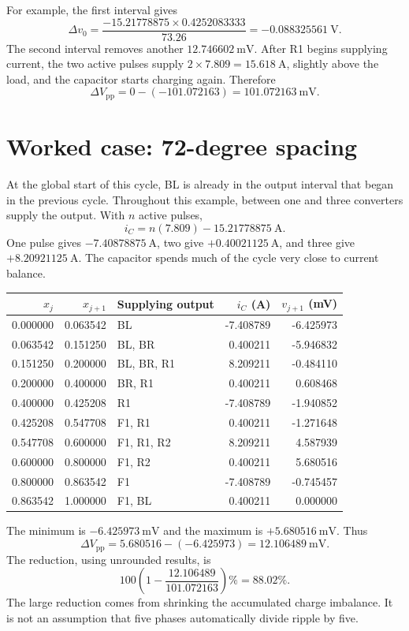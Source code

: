 \documentclass[11pt,a4paper]{article}
\begin{document}
For example, the first interval gives
\[
 \Delta v_0=\frac{-15.21778875\times0.4252083333}{73.26}
           =-0.088325561\ \mathrm{V}.
\]
The second interval removes another $12.746602\ \mathrm{mV}$. After R1 begins
supplying current, the two active pulses supply $2\times7.809=15.618\ \mathrm{A}$,
slightly above the load, and the capacitor starts charging again. Therefore
\[
 \Delta V_{\mathrm{pp}}=0-(-101.072163)=101.072163\ \mathrm{mV}.
\]

\section{Worked case: 72-degree spacing}

At the global start of this cycle, BL is already in the output interval that
began in the previous cycle. Throughout this example, between one and three
converters supply the output. With $n$ active pulses,
\[
 i_C=n(7.809)-15.21778875\ \mathrm{A}.
\]
One pulse gives $-7.40878875\ \mathrm{A}$, two give
$+0.40021125\ \mathrm{A}$, and three give $+8.20921125\ \mathrm{A}$.
The capacitor spends much of the cycle very close to current balance.

\begin{center}
\small
\begin{tabular}{rrlrr}
\toprule
$x_j$ & $x_{j+1}$ & Supplying output & $i_C$ (A) & $v_{j+1}$ (mV)\\
\midrule
0.000000 & 0.063542 & BL & -7.408789 & -6.425973\\
0.063542 & 0.151250 & BL, BR & 0.400211 & -5.946832\\
0.151250 & 0.200000 & BL, BR, R1 & 8.209211 & -0.484110\\
0.200000 & 0.400000 & BR, R1 & 0.400211 & 0.608468\\
0.400000 & 0.425208 & R1 & -7.408789 & -1.940852\\
0.425208 & 0.547708 & F1, R1 & 0.400211 & -1.271648\\
0.547708 & 0.600000 & F1, R1, R2 & 8.209211 & 4.587939\\
0.600000 & 0.800000 & F1, R2 & 0.400211 & 5.680516\\
0.800000 & 0.863542 & F1 & -7.408789 & -0.745457\\
0.863542 & 1.000000 & F1, BL & 0.400211 & 0.000000\\
\bottomrule
\end{tabular}
\end{center}

The minimum is $-6.425973\ \mathrm{mV}$ and the maximum is
$+5.680516\ \mathrm{mV}$. Thus
\[
 \Delta V_{\mathrm{pp}}=5.680516-(-6.425973)=12.106489\ \mathrm{mV}.
\]
The reduction, using unrounded results, is
\[
 100\left(1-\frac{12.106489}{101.072163}\right)\%=88.02\%.
\]
The large reduction comes from shrinking the accumulated charge imbalance.
It is not an assumption that five phases automatically divide ripple by five.
\end{document}
